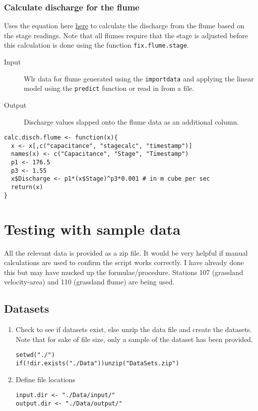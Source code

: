 \documentclass[a4paper]{article}
\begin{document}
\subsubsection*{Calculate discharge for the flume}
\label{sec:org3556260}

Uses the equation here \href{https://www.openchannelflow.com/flumes/montana-flumes/discharge-tables}{here} to calculate the discharge from the flume based on the stage readings. Note that all flumes require that the stage is adjusted before this calculation is done using the function \texttt{fix.flume.stage}.

\begin{description}
\item[{Input}] Wlr data for flume generated using the \texttt{importdata} and applying the linear model using the \texttt{predict} function or read in from a file.
\item[{Output}] Discharge values slapped onto the flume data as an additional column.
\end{description}

\begin{verbatim}
calc.disch.flume <- function(x){
  x <- x[,c("capacitance", "stagecalc", "timestamp")]
  names(x) <- c("Capacitance", "Stage", "Timestamp")
  p1 <- 176.5
  p3 <- 1.55
  x$Discharge <- p1*(x$Stage)^p3*0.001 # in m cube per sec
  return(x)
}
\end{verbatim}

\section*{Testing with sample data}
\label{sec:org1d20087}

All the relevant data is provided as a zip file. It would be very helpful if manual calculations are used to confirm the script works correctly. I have already done this but may have mucked up the formulae/procedure. Stations 107 (grassland velocity-area) and 110 (grassland flume) are being used.

\subsection*{Datasets}
\label{sec:org081cbc6}

\begin{enumerate}
\item Check to see if datasets exist, else unzip the data file and create the datasets. Note that for sake of file size, only a sample of the dataset has been provided.

\begin{verbatim}
setwd("./")
if(!dir.exists("./Data"))unzip("DataSets.zip")
\end{verbatim}

\item Define file locations

\begin{verbatim}
input.dir <- "./Data/input/"
output.dir <- "./Data/output/"
\end{verbatim}
\end{enumerate}
\end{document}
